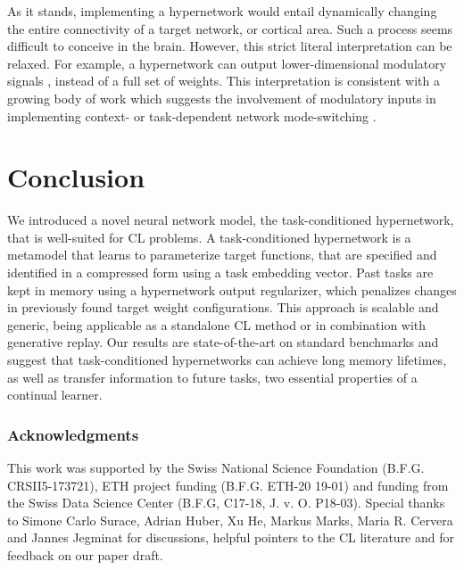 \documentclass{article}
\begin{document}
As it stands, implementing a hypernetwork would entail dynamically changing the entire connectivity of a target network, or cortical area. Such a process seems difficult to conceive in the brain. However, this strict literal interpretation can be relaxed. For example, a hypernetwork can output lower-dimensional modulatory signals \citep{marder_neuromodulation_2012}, instead of a full set of weights. This interpretation is consistent with a growing body of work which suggests the involvement of modulatory inputs in implementing context- or task-dependent network mode-switching \citep{mante_context-dependent_2013,jaeger_controlling_2014,stroud_motor_2018,masse2018alleviating}.

\section{Conclusion}

We introduced a novel neural network model, the task-conditioned hypernetwork, that is well-suited for CL problems. A task-conditioned hypernetwork is a metamodel that learns to parameterize target functions, that are specified and identified in a compressed form using a task embedding vector. Past tasks are kept in memory using a hypernetwork output regularizer, which penalizes changes in previously found target weight configurations. This approach is scalable and generic, being applicable as a standalone CL method or in combination with generative replay. Our results are state-of-the-art on standard benchmarks and suggest that task-conditioned hypernetworks can achieve long memory lifetimes, as well as transfer information to future tasks, two essential properties of a continual learner.

\subsubsection*{Acknowledgments}

This work was supported by the Swiss National Science Foundation (B.F.G. CRSII5-173721), ETH project funding (B.F.G. ETH-20 19-01) and funding from the Swiss Data Science Center (B.F.G, C17-18, J. v. O. P18-03).  Special thanks to Simone Carlo Surace, Adrian Huber, Xu He, Markus Marks, Maria R. Cervera and Jannes Jegminat for discussions, helpful pointers to the CL literature and for feedback on our paper draft.

\medskip



\setcounter{figure}{0} \renewcommand{\thefigure}{A\arabic{figure}}
\appendix
\end{document}
